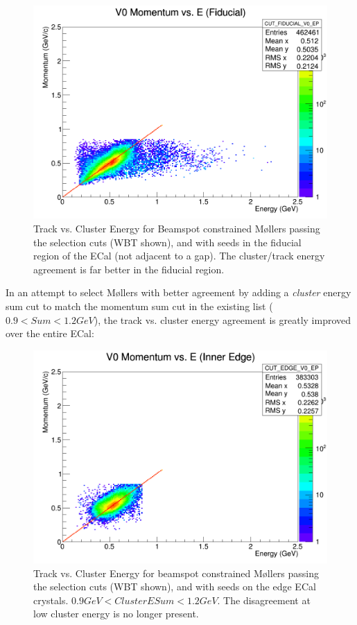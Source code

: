 \documentclass{article}
\begin{document}
\begin{figure}[H]
  	\includegraphics[width=\linewidth]{MollerPlots/FIDUCIAL_EP_bsc}
  	\caption{Track vs. Cluster Energy for Beamspot constrained M\o llers passing the selection cuts (WBT shown), and with seeds in the fiducial region of the ECal (not adjacent to a gap). The cluster/track energy agreement is far better in the fiducial region.}
  	\label{fig:EPFiducial}
	\end{figure}

In an attempt to select M\o llers with better agreement by adding a \textit{cluster} energy sum cut to match the momentum sum cut in the existing list ($0.9<Sum<1.2 GeV$), the track vs. cluster energy agreement is greatly improved over the entire ECal:

\begin{figure}[H]
  	\includegraphics[width=\linewidth]{MollerPlots/EDGE_EP_tightPSum}
  	\caption{Track vs. Cluster Energy for beamspot constrained M\o llers passing the selection cuts (WBT shown), and with seeds on the edge ECal crystals. $0.9 GeV<Cluster ESum<1.2GeV$. The disagreement at low cluster energy is no longer present.}
  	\label{fig:EPEdge2}
	\end{figure}
\end{document}
